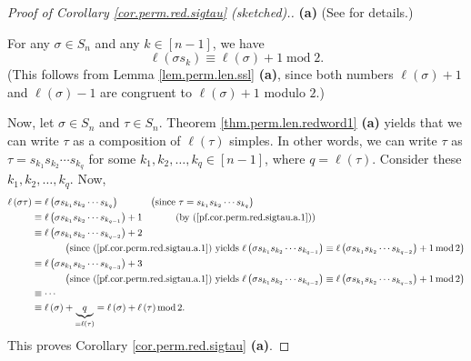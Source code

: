 \begin{proof}
[Proof of Corollary \ref{cor.perm.red.sigtau} (sketched).]\textbf{(a)} (See
\cite[Exercise 5.2 \textbf{(b)}]{detnotes} for details.)

For any $\sigma\in S_{n}$ and any $k\in\left[  n-1\right]  $, we have%
\begin{equation}
\ell\left(  \sigma s_{k}\right)  \equiv\ell\left(  \sigma\right)
+1\operatorname{mod}2. \label{pf.cor.perm.red.sigtau.a.1}%
\end{equation}
(This follows from Lemma \ref{lem.perm.len.ssl} \textbf{(a)}, since both
numbers $\ell\left(  \sigma\right)  +1$ and $\ell\left(  \sigma\right)  -1$
are congruent to $\ell\left(  \sigma\right)  +1$ modulo $2$.)

Now, let $\sigma\in S_{n}$ and $\tau\in S_{n}$. Theorem
\ref{thm.perm.len.redword1} \textbf{(a)} yields that we can write $\tau$ as a
composition of $\ell\left(  \tau\right)  $ simples. In other words, we can
write $\tau$ as $\tau=s_{k_{1}}s_{k_{2}}\cdots s_{k_{q}}$ for some
$k_{1},k_{2},\ldots,k_{q}\in\left[  n-1\right]  $, where $q=\ell\left(
\tau\right)  $. Consider these $k_{1},k_{2},\ldots,k_{q}$. Now,%
\begin{align*}
\ell\left(  \sigma\tau\right)   &  =\ell\left(  \sigma s_{k_{1}}s_{k_{2}%
}\cdots s_{k_{q}}\right)  \ \ \ \ \ \ \ \ \ \ \left(  \text{since }%
\tau=s_{k_{1}}s_{k_{2}}\cdots s_{k_{q}}\right) \\
&  \equiv\ell\left(  \sigma s_{k_{1}}s_{k_{2}}\cdots s_{k_{q-1}}\right)
+1\ \ \ \ \ \ \ \ \ \ \left(  \text{by (\ref{pf.cor.perm.red.sigtau.a.1}%
)}\right) \\
&  \equiv\ell\left(  \sigma s_{k_{1}}s_{k_{2}}\cdots s_{k_{q-2}}\right)  +2\\
&  \ \ \ \ \ \ \ \ \ \ \left(  \text{since (\ref{pf.cor.perm.red.sigtau.a.1})
yields }\ell\left(  \sigma s_{k_{1}}s_{k_{2}}\cdots s_{k_{q-1}}\right)
\equiv\ell\left(  \sigma s_{k_{1}}s_{k_{2}}\cdots s_{k_{q-2}}\right)
+1\operatorname{mod}2\right) \\
&  \equiv\ell\left(  \sigma s_{k_{1}}s_{k_{2}}\cdots s_{k_{q-3}}\right)  +3\\
&  \ \ \ \ \ \ \ \ \ \ \left(  \text{since (\ref{pf.cor.perm.red.sigtau.a.1})
yields }\ell\left(  \sigma s_{k_{1}}s_{k_{2}}\cdots s_{k_{q-2}}\right)
\equiv\ell\left(  \sigma s_{k_{1}}s_{k_{2}}\cdots s_{k_{q-3}}\right)
+1\operatorname{mod}2\right) \\
&  \equiv\cdots\\
&  \equiv\ell\left(  \sigma\right)  +\underbrace{q}_{=\ell\left(  \tau\right)
}=\ell\left(  \sigma\right)  +\ell\left(  \tau\right)  \operatorname{mod}2.
\end{align*}
This proves Corollary \ref{cor.perm.red.sigtau} \textbf{(a)}. \medskip


\end{proof}
